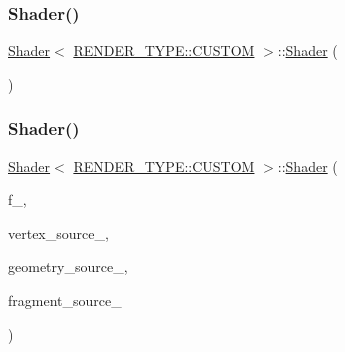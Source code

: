 \mbox{\label{classShader_3_01RENDER__TYPE_1_1CUSTOM_01_4_af1fbc8b0cb20d1af7905e2d896f0fb79}} 
\subsubsection{\texorpdfstring{Shader()}{Shader()}\hspace{0.1cm}{\footnotesize\ttfamily [4/8]}}
{\footnotesize\ttfamily \mbox{\hyperlink{classShader}{Shader}}$<$ \mbox{\hyperlink{shader__class_8hpp_a24e288e18eb7b6e01de7565001fedb60a72baef04098f035e8a320b03ad197818}{R\+E\+N\+D\+E\+R\+\_\+\+T\+Y\+P\+E\+::\+C\+U\+S\+T\+OM}} $>$\+::\mbox{\hyperlink{classShader}{Shader}} (\begin{DoxyParamCaption}\item[{const \mbox{\hyperlink{classShader}{Shader}}$<$ \mbox{\hyperlink{shader__class_8hpp_a24e288e18eb7b6e01de7565001fedb60a72baef04098f035e8a320b03ad197818}{R\+E\+N\+D\+E\+R\+\_\+\+T\+Y\+P\+E\+::\+C\+U\+S\+T\+OM}} $>$ \&}]{ }\end{DoxyParamCaption})\hspace{0.3cm}{\ttfamily [delete]}}

\mbox{\label{classShader_3_01RENDER__TYPE_1_1CUSTOM_01_4_a96f5985e060de5daa34e818aedfb7e23}} 
\subsubsection{\texorpdfstring{Shader()}{Shader()}\hspace{0.1cm}{\footnotesize\ttfamily [5/8]}}
{\footnotesize\ttfamily \mbox{\hyperlink{classShader}{Shader}}$<$ \mbox{\hyperlink{shader__class_8hpp_a24e288e18eb7b6e01de7565001fedb60a72baef04098f035e8a320b03ad197818}{R\+E\+N\+D\+E\+R\+\_\+\+T\+Y\+P\+E\+::\+C\+U\+S\+T\+OM}} $>$\+::\mbox{\hyperlink{classShader}{Shader}} (\begin{DoxyParamCaption}\item[{Q\+Open\+G\+L\+Functions $\ast$}]{f\+\_\+,  }\item[{const std\+::string \&}]{vertex\+\_\+source\+\_\+,  }\item[{const std\+::string \&}]{geometry\+\_\+source\+\_\+,  }\item[{const std\+::string \&}]{fragment\+\_\+source\+\_\+ }\end{DoxyParamCaption})\hspace{0.3cm}{\ttfamily [inline]}}

